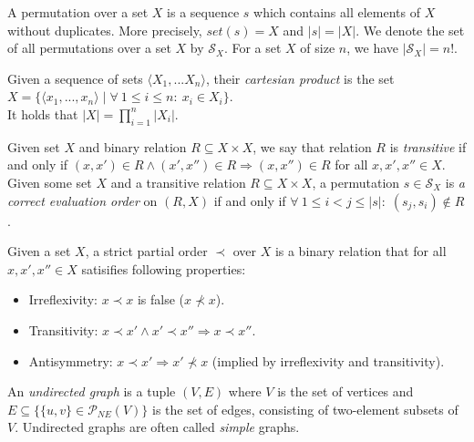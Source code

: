 \begin{definition}[Permutation]
A permutation over a set $X$ is a sequence $s$ which contains all elements of $X$ without duplicates.
More precisely, $set(s)=X$ and $|s|=|X|$.
We denote the set of all permutations over a set $X$ by $\mathcal{S}_X$.
For a set $X$ of size $n$, we have $|\mathcal{S}_X|=n!$.
\end{definition}


\begin{definition}
Given a sequence of sets $\langle X_1,...X_n \rangle$, their \emph{cartesian product} is the set 
$X= \{ \langle x_1,...,x_n \rangle \mid
\forall ~ 1\leq i \leq n: ~ x_i \in X_i \}$.\\
It holds that $|X|= \prod_{i=1}^n |X_i|$.
\end{definition}


\begin{definition}\label{eval}
Given set $X$ and binary relation $R \subseteq X \times X$, we say that relation $R$ is \emph{transitive} if and only if $(x,x') \in R \wedge (x',x'') \in R \Rightarrow (x,x'') \in R$ for all $x,x',x'' \in X$.
Given some set $X$ and a transitive relation $R \subseteq X \times X$,
a permutation $s \in \mathcal{S}_X$ is \emph{a correct evaluation order} on $(R,X)$ if and only if $ \forall ~ 1 \leq i < j \leq |s|: \; (s_j,s_i) \not \in R$.
\end{definition}


\begin{definition}
Given a set $X$, a strict partial order $\prec$ over $X$ is a binary relation that for all $x,x', x'' \in X$ satisifies following properties: 
\begin{itemize}
\item Irreflexivity: $x \prec x$ is false ($x \not \prec x$).
\item Transitivity: $x \prec x' \wedge x' \prec x'' \Rightarrow x \prec x''$.
\item Antisymmetry: $x \prec x' \Rightarrow x' \not \prec x$ (implied by irreflexivity and transitivity).
\end{itemize}
\end{definition}

\begin{definition}
An \emph{undirected graph} is a tuple $(V,E)$ where $V$ is the set of vertices and 
$E \subseteq \{ \{u,v\} \in \mathcal{P}_{NE}(V)\}$ is the set of edges, consisting of two-element subsets of $V$.
Undirected graphs are often called \emph{simple} graphs.
\end{definition}



